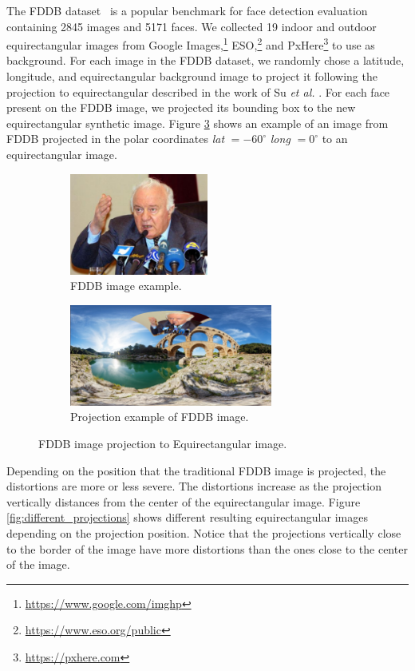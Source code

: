 The FDDB dataset~\cite{jain2010fddb} is a popular benchmark for face detection evaluation containing 2845 images and 5171 faces. We collected 19 indoor and outdoor equirectangular images from Google Images,\footnote{\url{https://www.google.com/imghp}} ESO,\footnote{\url{https://www.eso.org/public}} and PxHere\footnote{\url{https://pxhere.com}} to use as background.
For each image in the FDDB dataset, we randomly chose a latitude, longitude, and equirectangular background image to project it following the projection to equirectangular described in the work of Su \emph{et al.} \cite{su2017learning}.
For each face present on the FDDB image, we projected its bounding box to the new equirectangular synthetic image. Figure \ref{fig:authoring_fddb_proj} shows an example of an image from FDDB projected in the polar coordinates \emph{lat} $ = -60^{\circ}$ \emph{long} $ = 0^{\circ}$ to an equirectangular image.

\begin{figure}[!ht]
\centering
    \begin{subfigure}{0.4\linewidth}
        \centering
        \includegraphics[height=9em]{img/video360/face_pre.png}
        \caption{FDDB image example.}
        \label{subfig:face_pre}
    \end{subfigure}\hfill
    \begin{subfigure}{0.55\linewidth}
        \centering
         \includegraphics[height=9em]{img/video360/face_pos.png}
        \caption{Projection example of FDDB image.}
        \label{subfig:face_pos}
    \end{subfigure}

\caption{FDDB image projection to Equirectangular image.}
\label{fig:authoring_fddb_proj}
\end{figure}

Depending on the position that the traditional FDDB image is projected, the distortions are more or less severe. The distortions increase as the projection vertically distances from the center of the equirectangular image. Figure \ref{fig:different_projections} shows different resulting equirectangular images depending on the projection position. Notice that the projections vertically close to the border of the image have more distortions than the ones close to the center of the image.

